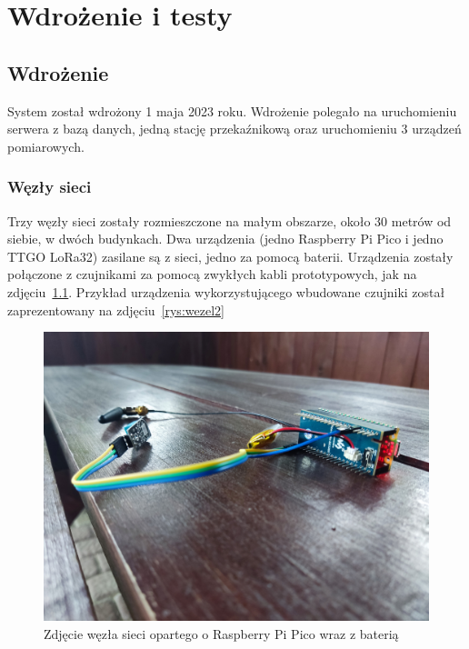 \chapter{Wdrożenie i testy}

\section{Wdrożenie}
System został wdrożony 1 maja 2023 roku. Wdrożenie polegało na uruchomieniu serwera z bazą danych, jedną stację przekaźnikową oraz uruchomieniu 3 urządzeń pomiarowych.

\subsection{Węzły sieci}

Trzy węzły sieci zostały rozmieszczone na małym obszarze, około 30 metrów od siebie, w dwóch budynkach. Dwa urządzenia (jedno Raspberry Pi Pico i jedno TTGO LoRa32) zasilane są z sieci, jedno za pomocą baterii. Urządzenia zostały połączone z czujnikami za pomocą zwykłych kabli prototypowych, jak na zdjęciu~\ref{rys:wezel1}. Przykład urządzenia wykorzystującego wbudowane czujniki został zaprezentowany na zdjęciu~\ref{rys:wezel2}

\begin{figure}[b!]
    \begin{center}
        \includegraphics[width=13cm]{pic/wezel1.jpg}
    \end{center}
    \caption{Zdjęcie węzła sieci opartego o Raspberry Pi Pico wraz z baterią}\label{rys:wezel1}
\end{figure}

